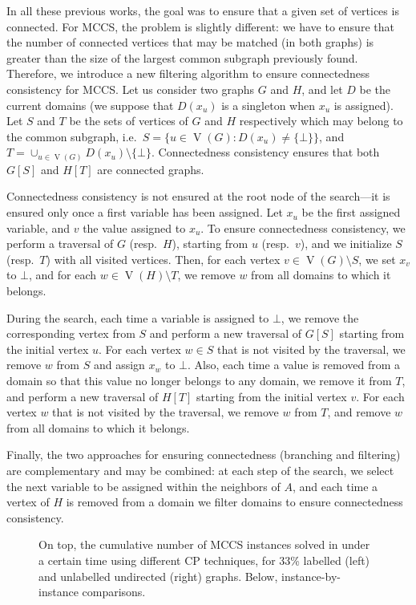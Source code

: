 \documentclass{llncs}
\begin{document}
In all these previous works, the goal was to ensure that a given set of vertices is connected. For
MCCS, the problem is slightly different: we have to ensure that the number of connected vertices
that may be matched (in both graphs) is greater than the size of the largest common subgraph
previously found. Therefore, we introduce a new filtering algorithm to ensure connectedness
consistency for MCCS.  Let us consider two graphs $G$ and $H$, and let $D$ be the current domains
(we suppose that $D(x_u)$ is a singleton when $x_u$ is assigned). Let $S$ and $T$ be the sets of
vertices of $G$ and $H$ respectively which may belong to the common subgraph, i.e.\ $S=\{ u\in
\operatorname{V}(G) : D(x_u)\neq\{\bot\}\}$, and $T = \cup_{u\in \operatorname{V}(G)} D(x_u)
\setminus \{ \bot \}$. Connectedness consistency ensures that both $G[S]$ and $H[T]$ are
connected graphs.

Connectedness consistency is not ensured at the root node of the search---it is ensured only once a
first variable has been assigned. Let $x_u$ be the first assigned variable, and $v$ the value
assigned to $x_u$. To ensure connectedness consistency, we perform a traversal of $G$ (resp.\ $H$),
starting from $u$ (resp.\ $v$), and we initialize $S$ (resp.\ $T$) with all visited vertices. Then,
for each vertex $v\in \operatorname{V}(G) \setminus S$, we set $x_v$ to $\bot$, and for each $w
\in \operatorname{V}(H) \setminus T$, we remove $w$ from all domains to which it belongs.

During the search, each time a variable is assigned to $\bot$, we remove the corresponding vertex
from $S$ and perform a new traversal of $G[S]$ starting from the initial vertex $u$. For each vertex
$w\in S$ that is not visited by the traversal, we remove $w$ from $S$ and assign $x_w$ to $\bot$.
Also, each time a value is removed from a domain so that this value no longer belongs to any domain,
we remove it from $T$, and perform a new traversal of $H[T]$ starting from the initial vertex $v$.
For each vertex $w$ that is not visited by the traversal, we remove $w$ from $T$, and remove $w$
from all domains to which it belongs.

Finally, the two approaches for ensuring connectedness (branching and filtering) are complementary
and may be combined: at each step of the search, we select the next variable to be assigned within
the neighbors of $A$, and each time a vertex of $H$ is removed from a domain we filter
domains to ensure connectedness consistency.

\begin{figure}[tb]
    \centering
    

    \vspace*{0.5em}
    \centering
    
    \caption{On top, the cumulative number of MCCS instances solved in under a certain time using
        different CP techniques, for 33\% labelled (left) and unlabelled undirected (right) graphs.
    Below, instance-by-instance comparisons.}
        \label{figure:connected-cp}
\end{figure}
\end{document}
